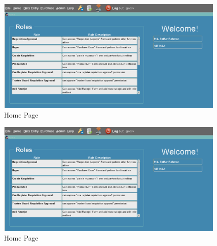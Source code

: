 \documentclass[12pt]{report} %
\begin{document}
\clearpage



\begin{figure}[h]
		\begin{center}
			\includegraphics[width=1\textwidth]{pic/home_page.png}
		\end{center}
	\caption{Home Page}
	\label{fig:home_page}
\end{figure}

\ifx
\clearpage

\begin{figure}[h]
	\includegraphics[width=1\textwidth]{pic/home_page.png}
	\caption{Home Page}
	\label{fig:home_page}
\end{figure}
\end{document}
